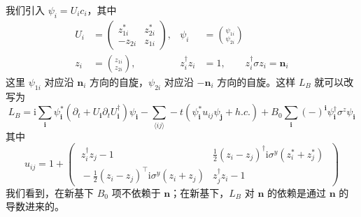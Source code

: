 我们引入 $\psi_{i}=U_{i}c_{i}$，其中
\begin{align*}
U_{i}&=\begin{pmatrix} z^{*}_{1i} & z^{*}_{2i}\\ -z_{2i} & z_{1i} \end{pmatrix}, & \psi_{i}&=\binom{\psi_{1i}}{\psi_{2i}}\\
z_{i}&=\binom{z_{1i}}{z_{2i}}, & z^{\dagger}_{i}z_{i}&=1,\qquad z^{\dagger}_{i}\sigma z_{i}=\pmb{n}_{i}
\end{align*}
这里 $\psi_{1i}$ 对应沿 $\pmb{n}_{i}$ 方向的自旋，$\psi_{2i}$ 对应沿 $-\pmb{n}_{i}$ 方向的自旋。这样 $L_{B}$ 就可以改写为
\begin{equation*}
L_{B}=\mathrm{i}\sum_{\pmb{i}}\psi^{*}_{\pmb{i}}\left(\partial_{t}+U_{\pmb{i}}\partial_{t}U^{\dagger}_{\pmb{i}}\right)\psi_{\pmb{i}}-\sum_{\langle ij\rangle}-t\left(\psi^{*}_{\pmb{i}}u_{ij}\psi_{\pmb{j}}+h.c.\right)+B_{0}\sum_{\pmb{i}}(-)^{\pmb{i}}\psi^{\dagger}_{\pmb{i}}\sigma^{z}\psi_{\pmb{i}}
\end{equation*}
其中
\begin{equation*}
u_{ij}=1+\begin{pmatrix}\; z^{\dagger}_{i}z_{j}-1 & \frac{1}{2}(z_{i}-z_{j})^{\dagger}\mathrm{i}\sigma^{y}(z^{*}_{i}+z^{*}_{j})\;\\[2pt]\; -\frac{1}{2}(z_{i}-z_{j})^{\top}\mathrm{i}\sigma^{y}(z_{i}+z_{j}) & z^{\dagger}_{j}z_{i}-1\; \end{pmatrix}
\end{equation*}
我们看到，在新基下 $B_{0}$ 项不依赖于 $\pmb{n}$；在新基下，$L_{B}$ 对 $\pmb{n}$ 的依赖是通过 $\pmb{n}$ 的导数进来的。

